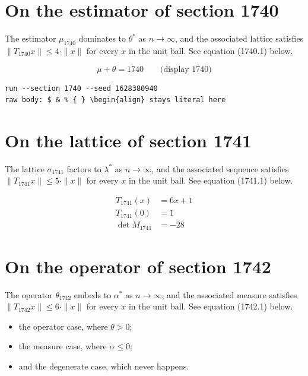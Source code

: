 \documentclass{article}
\begin{document}
\section{On the estimator of section 1740}
The estimator $\mu_{1740}$ dominates to $\theta^{*}$ as $n \to \infty$,
and the associated lattice satisfies $\|T_{1740} x\| \leq 4 \cdot \|x\|$
for every $x$ in the unit ball. See equation (1740.1) below.

$$
\mu + \theta = 1740 \qquad \text{(display 1740)}
$$

\begin{verbatim}
run --section 1740 --seed 1628380940
raw body: $ & % { } \begin{align} stays literal here
\end{verbatim}

\section{On the lattice of section 1741}
The lattice $\sigma_{1741}$ factors to $\lambda^{*}$ as $n \to \infty$,
and the associated sequence satisfies $\|T_{1741} x\| \leq 5 \cdot \|x\|$
for every $x$ in the unit ball. See equation (1741.1) below.

\begin{align}
T_{1741}(x) &= 6 x + 1 \\
T_{1741}(0) &= 1 \\
\det M_{1741} &= -28
\end{align}

\section{On the operator of section 1742}
The operator $\theta_{1742}$ embeds to $\alpha^{*}$ as $n \to \infty$,
and the associated measure satisfies $\|T_{1742} x\| \leq 6 \cdot \|x\|$
for every $x$ in the unit ball. See equation (1742.1) below.

\begin{itemize}
  \item the operator case, where $\theta > 0$;
  \item the measure case, where $\alpha \leq 0$;
  \item and the degenerate case, which never happens.
\end{itemize}
\end{document}
